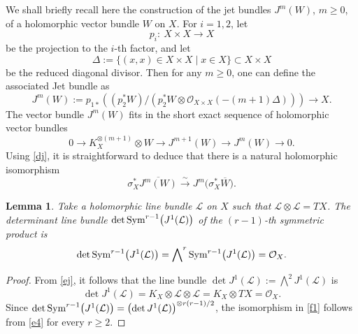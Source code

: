 \documentclass[10pt,a4paper]{amsart}
\numberwithin{equation}{section}
\newtheorem{Lemma}[Theorem]{Lemma}
\begin{document}
We shall briefly recall here the construction of the jet bundles $J^m(W)$, $m \geq 0$, of
a holomorphic vector bundle $W$ on $X$. For $i = 1, 2$, let
\begin{equation}\label{z1}
p_i\colon\ X\times X \longrightarrow X
\end{equation}
be the projection to the $i$-th factor, and let
\begin{equation}\label{z2}
\Delta := \{(x, x) \in X\times X \mid x \in X\} \subset X\times X
\end{equation}
be the reduced diagonal divisor. Then for any $m \geq 0$, one can define the associated Jet bundle as
\begin{equation}\label{dj}
J^m(W) := p_{1*}((p^*_2W)/(p^*_2W\otimes
{\mathcal O}_{X\times X}(-(m+1)\Delta))) \longrightarrow X.
\end{equation}
The vector bundle $J^m(W)$ fits in the short exact sequence of holomorphic vector bundles
\begin{equation}\label{ej}
0 \longrightarrow K^{\otimes (m+1)}_X\otimes W \longrightarrow J^{m+1}(W)
 \longrightarrow J^m(W) \longrightarrow 0.
\end{equation}
Using \eqref{dj}, it is straightforward to deduce that there is a natural holomorphic
isomorphism
\begin{equation}\label{dj2}
\sigma^*_X \overline{J^m(W)} \stackrel{\sim}{\longrightarrow}
J^m\bigl(\sigma^*_X\overline{W}\bigr).
\end{equation}

\begin{Lemma}\label{4.7}
Take a holomorphic line bundle $\mathcal L$ on $X$ such that ${\mathcal L}\otimes{\mathcal L} = TX$. The determinant
line bundle $\det {\rm Sym}^{r-1}\bigl(J^1(\mathcal L)\bigr)$ of the $(r-1)$-th symmetric product is
\begin{equation}\label{f1}
\det {\rm Sym}^{r-1}\bigl(J^1(\mathcal L)\bigr) = \bigwedge\nolimits^r {\rm Sym}^{r-1}\bigl(J^1(\mathcal L)\bigr)
 = {\mathcal O}_X.
\end{equation}
\end{Lemma}

\begin{proof}
{}From \eqref{ej}, it follows that the line bundle $\det J^1(\mathcal L) :=
\bigwedge^2 J^1(\mathcal L)$ is
\begin{equation}\label{e4}
\det J^1(\mathcal L) = K_X\otimes {\mathcal L}\otimes {\mathcal L} = K_X\otimes TX = {\mathcal O}_X.
\end{equation}
Since $\det {\rm Sym}^{r-1}\bigl(J^1(\mathcal L)\bigr) = \bigl(\det J^1(\mathcal L)\bigr)^{\otimes r(r-1)/2}$, the
isomorphism in \eqref{f1} follows from \eqref{e4} for every $r \geq 2$.
\end{proof}
\end{document}
